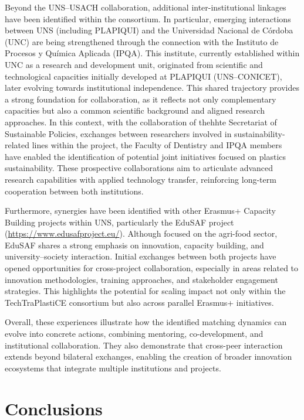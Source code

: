 \documentclass[
  12pt,
  oneside]{book}
\begin{document}
Beyond the UNS--USACH collaboration, additional inter-institutional
linkages have been identified within the consortium. In particular,
emerging interactions between UNS (including PLAPIQUI) and the
Universidad Nacional de Córdoba (UNC) are being strengthened through the
connection with the Instituto de Procesos y Química Aplicada (IPQA).
This institute, currently established within UNC as a research and
development unit, originated from scientific and technological
capacities initially developed at PLAPIQUI (UNS--CONICET), later
evolving towards institutional independence. This shared trajectory
provides a strong foundation for collaboration, as it reflects not only
complementary capacities but also a common scientific background and
aligned research approaches. In this context, with the collaboration of
thehhte Secretariat of Sustainable Policies, exchanges between
researchers involved in sustainability-related lines within the project,
the Faculty of Dentistry and IPQA members have enabled the
identification of potential joint initiatives focused on plastics
sustainability. These prospective collaborations aim to articulate
advanced research capabilities with applied technology transfer,
reinforcing long-term cooperation between both institutions.

Furthermore, synergies have been identified with other Erasmus+ Capacity
Building projects within UNS, particularly the EduSAF project
(\url{https://www.edusafproject.eu/}). Although focused on the agri-food
sector, EduSAF shares a strong emphasis on innovation, capacity
building, and university--society interaction. Initial exchanges between
both projects have opened opportunities for cross-project collaboration,
especially in areas related to innovation methodologies, training
approaches, and stakeholder engagement strategies. This highlights the
potential for scaling impact not only within the TechTraPlastiCE
consortium but also across parallel Erasmus+ initiatives.

Overall, these experiences illustrate how the identified matching
dynamics can evolve into concrete actions, combining mentoring,
co-development, and institutional collaboration. They also demonstrate
that cross-peer interaction extends beyond bilateral exchanges, enabling
the creation of broader innovation ecosystems that integrate multiple
institutions and projects.

\chapter{Conclusions}\label{conclusions}
\end{document}
